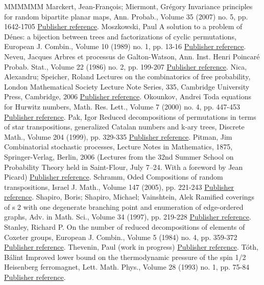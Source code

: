 \documentclass[11pt]{article}
\theoremstyle{definition}
\numberwithin{equation}{section}
\numberwithin{figure}{section}
\numberwithin{table}{section}
\begin{document}
\begin{thebibliography}{MMMMMM}
 Marckert, Jean-François; Miermont, Grégory Invariance principles for random bipartite planar maps, Ann. Probab., Volume 35 (2007) no. 5, pp. 1642-1705 \href{https://ahl.centre-mersenne.org/item/AHL_2018__1__149_0/#MM07}{Publisher reference}.
 Moszkowski, Paul A solution to a problem of Dénes: a bijection between trees and factorizations of cyclic permutations, European J. Combin., Volume 10 (1989) no. 1, pp. 13-16 \href{https://ahl.centre-mersenne.org/item/AHL_2018__1__149_0/#Mos89}{Publisher reference}.
 Neveu, Jacques Arbres et processus de Galton-Watson, Ann. Inst. Henri Poincaré Probab. Stat., Volume 22 (1986) no. 2, pp. 199-207 \href{https://ahl.centre-mersenne.org/item/AHL_2018__1__149_0/#Nev86}{Publisher reference}.
 Nica, Alexandru; Speicher, Roland Lectures on the combinatorics of free probability, London Mathematical Society Lecture Note Series, 335, Cambridge University Press, Cambridge, 2006 \href{https://ahl.centre-mersenne.org/item/AHL_2018__1__149_0/#NS06}{Publisher reference}.
 Okounkov, Andrei Toda equations for Hurwitz numbers, Math. Res. Lett., Volume 7 (2000) no. 4, pp. 447-453 \href{https://ahl.centre-mersenne.org/item/AHL_2018__1__149_0/#Oko00}{Publisher reference}.
 Pak, Igor Reduced decompositions of permutations in terms of star transpositions, generalized Catalan numbers and k-ary trees, Discrete Math., Volume 204 (1999), pp. 329-335 \href{https://ahl.centre-mersenne.org/item/AHL_2018__1__149_0/#Pak1999}{Publisher reference}.
 Pitman, Jim Combinatorial stochastic processes, Lecture Notes in Mathematics, 1875, Springer-Verlag, Berlin, 2006 (Lectures from the 32nd Summer School on Probability Theory held in Saint-Flour, July 7–24. With a foreword by Jean Picard) \href{https://ahl.centre-mersenne.org/item/AHL_2018__1__149_0/#Pit06}{Publisher reference}.
 Schramm, Oded Compositions of random transpositions, Israel J. Math., Volume 147 (2005), pp. 221-243 \href{https://ahl.centre-mersenne.org/item/AHL_2018__1__149_0/#Scr05}{Publisher reference}.
 Shapiro, Boris; Shapiro, Michael; Vainshtein, Alek Ramified coverings of s 2  with one degenerate branching point and enumeration of edge-ordered graphs, Adv. in Math. Sci., Volume 34 (1997), pp. 219-228 \href{https://ahl.centre-mersenne.org/item/AHL_2018__1__149_0/#SSV97}{Publisher reference}.
 Stanley, Richard P. On the number of reduced decompositions of elements of Coxeter groups, European J. Combin., Volume 5 (1984) no. 4, pp. 359-372 \href{https://ahl.centre-mersenne.org/item/AHL_2018__1__149_0/#Sta84}{Publisher reference}.
 Thevenin, Paul (work in progress) \href{https://ahl.centre-mersenne.org/item/AHL_2018__1__149_0/#Thev18}{Publisher reference}.
 Tóth, Bálint Improved lower bound on the thermodynamic pressure of the spin 1/2 Heisenberg ferromagnet, Lett. Math. Phys., Volume 28 (1993) no. 1, pp. 75-84 \href{https://ahl.centre-mersenne.org/item/AHL_2018__1__149_0/#Tot93}{Publisher reference}.
\end{thebibliography}
\end{document}
